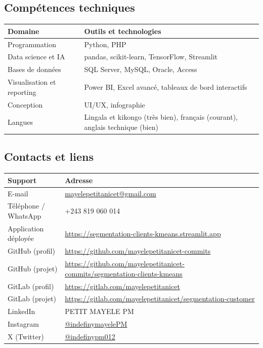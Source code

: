 \documentclass[11pt,a4paper]{article}
\begin{document}
\subsection{Compétences techniques}
\begin{center}
\begin{tabularx}{0.95\textwidth}{@{}lX@{}}
\toprule
\textbf{Domaine} & \textbf{Outils et technologies}\\
\midrule
Programmation & Python, PHP\\
Data science et IA & pandas, scikit-learn, TensorFlow, Streamlit\\
Bases de données & SQL Server, MySQL, Oracle, Access\\
Visualisation et reporting & Power BI, Excel avancé, tableaux de bord interactifs\\
Conception & UI/UX, infographie\\
Langues & Lingala et kikongo (très bien), français (courant), anglais technique (bien)\\
\bottomrule
\end{tabularx}
\end{center}

\subsection{Contacts et liens}
\begin{center}
\begin{tabularx}{0.95\textwidth}{@{}lX@{}}
\toprule
\textbf{Support} & \textbf{Adresse}\\
\midrule
E-mail & \href{mailto:mayelepetitanicet@gmail.com}{mayelepetitanicet@gmail.com}\\
Téléphone / WhatsApp & +243 819 060 014\\
Application déployée & \url{https://segmentation-clients-kmeans.streamlit.app}\\
GitHub (profil) & \url{https://github.com/mayelepetitanicet-commits}\\
GitHub (projet) & \url{https://github.com/mayelepetitanicet-commits/segmentation-clients-kmeans}\\
GitLab (profil) & \url{https://gitlab.com/mayelepetitanicet}\\
GitLab (projet) & \url{https://gitlab.com/mayelepetitanicet/segmentation-customer}\\
LinkedIn & PETIT MAYELE PM\\
Instagram & \href{https://www.instagram.com/indefinymayelePM}{@indefinymayelePM}\\
X (Twitter) & \href{https://x.com/indefinypm012}{@indefinypm012}\\
\bottomrule
\end{tabularx}
\end{center}
\end{document}
